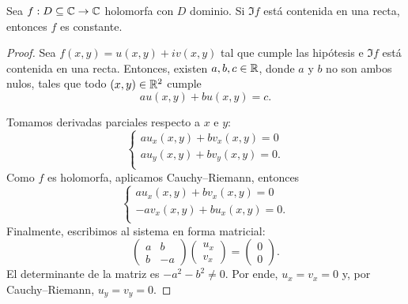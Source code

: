 \begin{proposition}
    Sea $f: D \subseteq \mathbb{C} \to \mathbb{C}$ holomorfa con $D$ dominio. Si $\Im f$ está contenida en una recta, entonces $f$ es constante.
\end{proposition}

\begin{proof}
    Sea $f(x, y) = u(x, y) + i v(x, y)$ tal que cumple las hipótesis e $\Im f$ está contenida en una recta. Entonces, existen $a, b, c \in \mathbb{R}$, donde $a$ y $b$ no son ambos nulos, tales que todo $(x, y) \in \mathbb{R}^2$ cumple
    \begin{equation*}
        a u(x, y) + b u(x, y) = c.
    \end{equation*}

    Tomamos derivadas parciales respecto a $x$ e $y$:
    \begin{equation*}
        \begin{cases}
            a u_x(x, y) + bv_x(x, y) = 0 \\
            a u_y(x, y) + bv_y(x, y) = 0. \\
        \end{cases}
    \end{equation*}
    Como $f$ es holomorfa, aplicamos Cauchy--Riemann, entonces
    \begin{equation*}
        \begin{cases}
            a u_x(x, y) + bv_x(x, y) = 0 \\
            -a v_x(x, y) + bu_x(x, y) = 0. \\
        \end{cases}
    \end{equation*}
    Finalmente, escribimos al sistema en forma matricial:
    \begin{equation*}
        \begin{pmatrix}
            a & b \\
            b & -a 
        \end{pmatrix}
        \begin{pmatrix}
            u_x \\
            v_x
        \end{pmatrix}
        =
        \begin{pmatrix}
            0 \\
            0
        \end{pmatrix}.
    \end{equation*}
    El determinante de la matriz es $-a^2 - b^2 \neq 0$. Por ende, $u_x = v_x = 0$ y, por Cauchy--Riemann, $u_y = v_y = 0$.
\end{proof}


